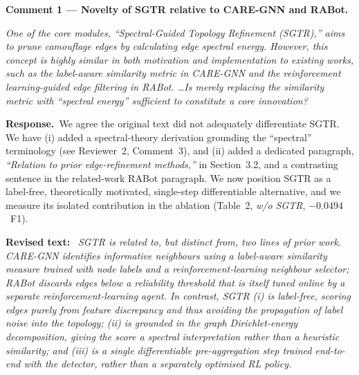 \documentclass[11pt]{article}
\newenvironment{comment}
  {\par\medskip\noindent
   \colorlet{shadecolor}{cmtbg}%
   \def\FrameCommand{\color{cmtrule}\vrule width 2pt\hspace{8pt}}%
   \begin{shaded}\itshape\small}
  {\end{shaded}\par\smallskip}
\newcommand{\response}{\par\smallskip\noindent\textbf{Response.}\ }
\newenvironment{revised}
  {\par\smallskip\noindent
   \def\FrameCommand{\color{exrule}\vrule width 2pt\hspace{8pt}}%
   \MakeFramed{\advance\hsize-\width \FrameRestore}%
   \small\textcolor{exrule}{\textbf{Revised text:}}\ \itshape}
  {\endMakeFramed\par\smallskip}
\newcommand{\rc}[1]{\medskip\noindent\textbf{#1}\par}
\begin{document}
\rc{Comment 1 --- Novelty of SGTR relative to CARE-GNN and RABot.}
\begin{comment}
One of the core modules, ``Spectral-Guided Topology Refinement (SGTR),'' aims to
prune camouflage edges by calculating edge spectral energy. However, this concept is
highly similar in both motivation and implementation to existing works, such as the
label-aware similarity metric in CARE-GNN and the reinforcement learning-guided edge
filtering in RABot. \ldots Is merely replacing the similarity metric with ``spectral
energy'' sufficient to constitute a core innovation?
\end{comment}
\response We agree the original text did not adequately differentiate SGTR. We have
(i) added a spectral-theory derivation grounding the ``spectral'' terminology (see
Reviewer~2, Comment~3), and (ii) added a dedicated paragraph, \emph{``Relation to
prior edge-refinement methods,''} in Section~3.2, and a contrasting sentence in the
related-work RABot paragraph. We now position SGTR as a label-free, theoretically
motivated, single-step differentiable alternative, and we measure its isolated
contribution in the ablation (Table~2, \emph{w/o SGTR}, $-0.0494$~F1).
\begin{revised}
SGTR is related to, but distinct from, two lines of prior work. CARE-GNN identifies
informative neighbours using a \emph{label-aware} similarity measure trained with
node labels and a reinforcement-learning neighbour selector; RABot discards edges
below a reliability threshold that is itself tuned online by a separate
reinforcement-learning agent. In contrast, SGTR (i) is \emph{label-free}, scoring
edges purely from feature discrepancy and thus avoiding the propagation of label
noise into the topology; (ii) is grounded in the graph Dirichlet-energy
decomposition, giving the score a spectral interpretation rather than a heuristic
similarity; and (iii) is a single differentiable pre-aggregation step trained
end-to-end with the detector, rather than a separately optimised RL policy.
\end{revised}
\end{document}
